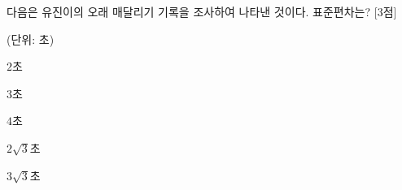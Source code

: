 다음은 유진이의 오래 매달리기 기록을 조사하여 나타낸 것이다. 표준편차는? \mbox{[3점]}\par\noindent\hfill{\footnotesize (단위: 초)}
\begin{choices32}{\rule[-3ex]{0pt}{8ex}$2$초}{\rule[-3ex]{0pt}{8ex}$3$초}{\rule[-3ex]{0pt}{8ex}$4$초}{\rule[-3ex]{0pt}{8ex}$2\sqrt{3}$초}{\rule[-3ex]{0pt}{8ex}$3\sqrt{3}$초}\end{choices32}
